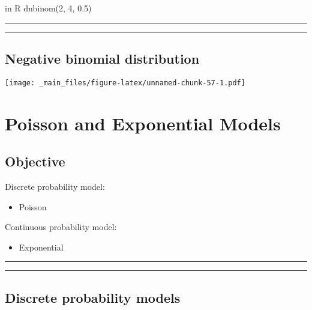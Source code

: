 \documentclass[
]{book}
\providecommand{\tightlist}{%
  \setlength{\itemsep}{0pt}\setlength{\parskip}{0pt}}
\begin{document}
in R dnbinom(2, 4, 0.5)

\begin{center}\rule{0.5\linewidth}{0.5pt}\end{center}

\begin{center}\rule{0.5\linewidth}{0.5pt}\end{center}

\hypertarget{negative-binomial-distribution-3}{%
\section{Negative binomial distribution}\label{negative-binomial-distribution-3}}

\texttt{[image: \_main\_files/figure-latex/unnamed-chunk-57-1.pdf]}

\hypertarget{poisson-and-exponential-models}{%
\chapter{Poisson and Exponential Models}\label{poisson-and-exponential-models}}

\hypertarget{objective-6}{%
\section{Objective}\label{objective-6}}

Discrete probability model:

\begin{itemize}
\tightlist
\item
  Poisson
\end{itemize}

Continuous probability model:

\begin{itemize}
\tightlist
\item
  Exponential
\end{itemize}

\begin{center}\rule{0.5\linewidth}{0.5pt}\end{center}

\begin{center}\rule{0.5\linewidth}{0.5pt}\end{center}

\hypertarget{discrete-probability-models-1}{%
\section{Discrete probability models}\label{discrete-probability-models-1}}
\end{document}
